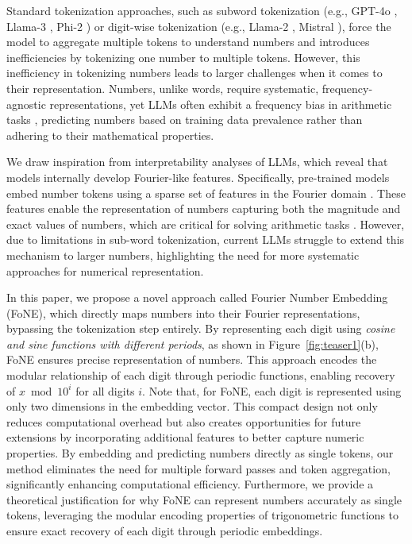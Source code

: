 Standard tokenization approaches, such as subword tokenization (e.g., GPT-4o \cite{achiam2023gpt}, Llama-3 \cite{dubey2024llama}, Phi-2 \cite{abdin2024phi}) or digit-wise tokenization (e.g., Llama-2 \cite{touvron2023llama}, Mistral \cite{jiang2023mistral}), force the model to aggregate multiple tokens to understand numbers and introduces inefficiencies by tokenizing one number to multiple tokens. However, this inefficiency in tokenizing numbers leads to larger challenges when it comes to their representation. Numbers, unlike words, require systematic, frequency-agnostic representations, yet LLMs often exhibit a frequency bias in arithmetic tasks \cite{razeghi2022impact}, predicting numbers based on training data prevalence rather than adhering to their mathematical properties.



We draw inspiration from interpretability analyses of LLMs, which reveal that  models internally develop Fourier-like features. Specifically, pre-trained models embed number tokens using a sparse set of features in the Fourier domain \cite{zhou2024pre}.
These features enable the representation of numbers capturing both the magnitude and exact values of numbers, which are critical for solving arithmetic tasks \cite{zhou2024pre}. However, due to limitations in sub-word tokenization, current LLMs struggle to extend this mechanism to larger numbers, highlighting the need for more systematic approaches for numerical representation.

In this paper, we propose a novel approach called Fourier Number Embedding (FoNE), which directly maps numbers into their Fourier representations, bypassing the tokenization step entirely. By representing each digit using \textit{cosine and sine functions with different periods}, as shown in Figure~\ref{fig:teaser1}(b), FoNE ensures precise representation of numbers. This approach encodes the modular relationship of each digit through periodic functions, enabling recovery of \( x \bmod 10^i \) for all digits \( i \). Note that, for FoNE, each digit is represented using only two dimensions in the embedding vector. This compact design not only reduces computational overhead but also creates opportunities for future extensions by incorporating additional features to better capture numeric properties. By embedding and predicting numbers directly as single tokens, our method eliminates the need for multiple forward passes and token aggregation, significantly enhancing computational efficiency. Furthermore, we provide a theoretical justification for why FoNE can represent numbers accurately as single tokens, leveraging the modular encoding properties of trigonometric functions to ensure exact recovery of each digit through periodic embeddings.

